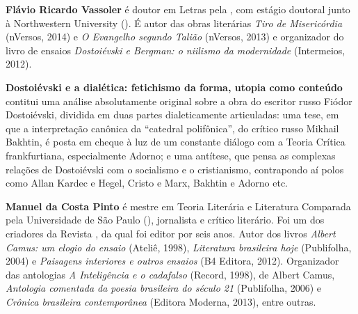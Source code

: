 
\textbf{Flávio Ricardo Vassoler} é doutor em Letras pela , com estágio doutoral junto à
  Northwestern University (). É autor das obras literárias \emph{Tiro
  de Misericórdia} (nVersos, 2014) e \emph{O Evangelho segundo Talião}
  (nVersos, 2013) e organizador do livro de ensaios \emph{Dostoiévski e
  Bergman: o niilismo da modernidade} (Intermeios, 2012).

\textbf{Dostoiévski e a dialética: fetichismo da forma, utopia como conteúdo} contitui uma análise absolutamente original sobre a obra do escritor russo Fiódor Dostoiévski, dividida em duas partes dialeticamente articuladas: uma tese, em que a interpretação canônica da ``catedral polifônica'', do crítico russo Mikhail Bakhtin, é posta em cheque à luz de um constante diálogo com a Teoria Crítica frankfurtiana, especialmente Adorno; e uma antítese, que pensa as complexas relações de Dostoiévski com o socialismo e o cristianismo, contrapondo aí polos como Allan Kardec e Hegel, Cristo e Marx, Bakhtin e Adorno etc.

\textbf{Manuel da Costa Pinto} é mestre em Teoria Literária e Literatura Comparada pela Universidade de São Paulo (), jornalista e crítico literário. Foi um dos criadores da Revista , da qual foi editor por seis anos. Autor dos livros \emph{Albert Camus: um elogio do ensaio} (Ateliê, 1998), \emph{Literatura brasileira hoje} (Publifolha, 2004) e \emph{Paisagens interiores e outros ensaios} (B4 Editora, 2012). Organizador das antologias \emph{A Inteligência e o cadafalso} (Record, 1998), de Albert Camus, \emph{Antologia comentada da poesia brasileira do século 21} (Publifolha, 2006) e \emph{Crônica brasileira contemporânea} (Editora Moderna, 2013), entre outras.






